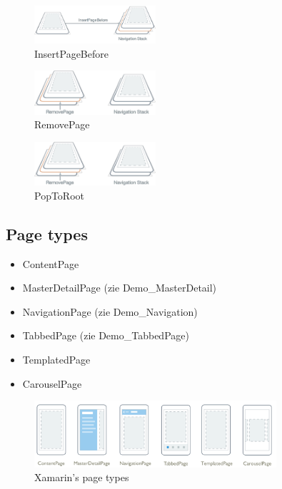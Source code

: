 \documentclass{article}
\begin{document}
\begin{figure}[H]
    \centering
    \includegraphics[width=0.4\textwidth]{navigation-stack-3.png}
    \caption{InsertPageBefore}
\end{figure}

\begin{figure}[H]
    \centering
    \includegraphics[width=0.4\textwidth]{navigation-stack-4.png}
    \caption{RemovePage}
\end{figure}


\begin{figure}[H]
    \centering
    \includegraphics[width=0.4\textwidth]{navigation-stack-4.png}
    \caption{PopToRoot}
\end{figure}

\subsection{Page types}

\begin{itemize}
    \item ContentPage
    \item MasterDetailPage (zie Demo\_MasterDetail)
    \item NavigationPage (zie Demo\_Navigation)
    \item TabbedPage (zie Demo\_TabbedPage)
    \item TemplatedPage
    \item CarouselPage 
\end{itemize}

\begin{figure}[H]
    \centering
    \includegraphics[width=0.8\textwidth]{pagetypes.png}
    \caption{Xamarin's page types}
\end{figure}
\end{document}
